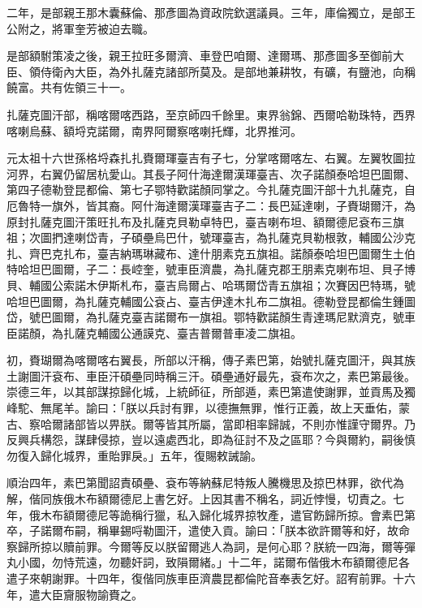 \begin{pinyinscope}
二年，是部親王那木囊蘇倫、那彥圖為資政院欽選議員。三年，庫倫獨立，是部王公附之，將軍奎芳被迫去職。

是部額駙策凌之後，親王拉旺多爾濟、車登巴咱爾、達爾瑪、那彥圖多至御前大臣、領侍衛內大臣，為外扎薩克諸部所莫及。是部地兼耕牧，有礦，有鹽池，向稱饒富。共有佐領三十一。

扎薩克圖汗部，稱喀爾喀西路，至京師四千餘里。東界翁錦、西爾哈勒珠特，西界喀喇烏蘇、額埒克諾爾，南界阿爾察喀喇托輝，北界推河。

元太祖十六世孫格埒森扎扎賚爾琿臺吉有子七，分掌喀爾喀左、右翼。左翼牧圖拉河界，右翼仍留居杭愛山。其長子阿什海達爾漢琿臺吉、次子諾顏泰哈坦巴圖爾、第四子德勒登昆都倫、第七子鄂特歡諾顏同掌之。今扎薩克圖汗部十九扎薩克，自厄魯特一旗外，皆其裔。阿什海達爾漢琿臺吉子二：長巴延達喇，子賚瑚爾汗，為原封扎薩克圖汗策旺扎布及扎薩克貝勒卓特巴，臺吉喇布坦、額爾德尼袞布三旗祖；次圖捫達喇岱青，子碩壘烏巴什，號琿臺吉，為扎薩克貝勒根敦，輔國公沙克扎、齊巴克扎布，臺吉納瑪琳藏布、達什朋素克五旗祖。諾顏泰哈坦巴圖爾生土伯特哈坦巴圖爾，子二：長崆奎，號車臣濟農，為扎薩克郡王朋素克喇布坦、貝子博貝、輔國公索諾木伊斯札布，臺吉烏爾占、哈瑪爾岱青五旗祖；次賽因巴特瑪，號哈坦巴圖爾，為扎薩克輔國公袞占、臺吉伊達木扎布二旗祖。德勒登昆都倫生鍾圖岱，號巴圖爾，為扎薩克臺吉諾爾布一旗祖。鄂特歡諾顏生青達瑪尼默濟克，號車臣諾顏，為扎薩克輔國公通謨克、臺吉普爾普車凌二旗祖。

初，賚瑚爾為喀爾喀右翼長，所部以汗稱，傳子素巴第，始號扎薩克圖汗，與其族土謝圖汗袞布、車臣汗碩壘同時稱三汗。碩壘通好最先，袞布次之，素巴第最後。崇德三年，以其部謀掠歸化城，上統師征，所部遁，素巴第遣使謝罪，並貢馬及獨峰駝、無尾羊。諭曰：「朕以兵討有罪，以德撫無罪，惟行正義，故上天垂佑，蒙古、察哈爾諸部皆以畀朕。爾等皆其所屬，當即相率歸誠，不則亦惟謹守爾界。乃反興兵構怨，謀肆侵掠，豈以遠處西北，即為征討不及之區耶？今與爾約，嗣後慎勿復入歸化城界，重貽罪戾。」五年，復賜敕誡諭。

順治四年，素巴第聞詔責碩壘、袞布等納蘇尼特叛人騰機思及掠巴林罪，欲代為解，偕同族俄木布額爾德尼上書乞好。上因其書不稱名，詞近悖慢，切責之。七年，俄木布額爾德尼等詭稱行獵，私入歸化城界掠牧產，遣官飭歸所掠。會素巴第卒，子諾爾布嗣，稱畢錫哷勒圖汗，遣使入貢。諭曰：「朕本欲許爾等和好，故命察歸所掠以贖前罪。今爾等反以朕留爾逃人為詞，是何心耶？朕統一四海，爾等彈丸小國，勿恃荒遠，勿聽奸詞，致隕爾緒。」十二年，諾爾布偕俄木布額爾德尼各遣子來朝謝罪。十四年，復偕同族車臣濟農昆都倫陀音奉表乞好。詔宥前罪。十六年，遣大臣齎服物諭賚之。


\end{pinyinscope}
